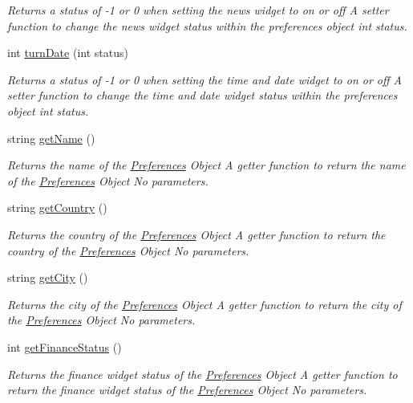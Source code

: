 \begin{DoxyCompactItemize}
\begin{DoxyCompactList}\small\item\em Returns a status of -\/1 or 0 when setting the news widget to on or off  A setter function to change the news widget status within the preferences object  int status. \end{DoxyCompactList}\item 
int \mbox{\hyperlink{class_preferences_a6c2ed2905019c8231a1b9627e25c15b0}{turn\+Date}} (int status)
\begin{DoxyCompactList}\small\item\em Returns a status of -\/1 or 0 when setting the time and date widget to on or off  A setter function to change the time and date widget status within the preferences object  int status. \end{DoxyCompactList}\item 
string \mbox{\hyperlink{class_preferences_a2496f5889a605786bfd0971a421ce70b}{get\+Name}} ()
\begin{DoxyCompactList}\small\item\em Returns the name of the \mbox{\hyperlink{class_preferences}{Preferences}} Object  A getter function to return the name of the \mbox{\hyperlink{class_preferences}{Preferences}} Object  No parameters. \end{DoxyCompactList}\item 
string \mbox{\hyperlink{class_preferences_ac7df042c5760319cd884048c7f85c0e3}{get\+Country}} ()
\begin{DoxyCompactList}\small\item\em Returns the country of the \mbox{\hyperlink{class_preferences}{Preferences}} Object  A getter function to return the country of the \mbox{\hyperlink{class_preferences}{Preferences}} Object  No parameters. \end{DoxyCompactList}\item 
string \mbox{\hyperlink{class_preferences_a2a14e274fd369d3d36793170f62458cb}{get\+City}} ()
\begin{DoxyCompactList}\small\item\em Returns the city of the \mbox{\hyperlink{class_preferences}{Preferences}} Object  A getter function to return the city of the \mbox{\hyperlink{class_preferences}{Preferences}} Object  No parameters. \end{DoxyCompactList}\item 
int \mbox{\hyperlink{class_preferences_a9c1c270a1e37321e6eb9b5eb90a91aba}{get\+Finance\+Status}} ()
\begin{DoxyCompactList}\small\item\em Returns the finance widget status of the \mbox{\hyperlink{class_preferences}{Preferences}} Object  A getter function to return the finance widget status of the \mbox{\hyperlink{class_preferences}{Preferences}} Object  No parameters. \end{DoxyCompactList}\item 

\end{DoxyCompactItemize}
